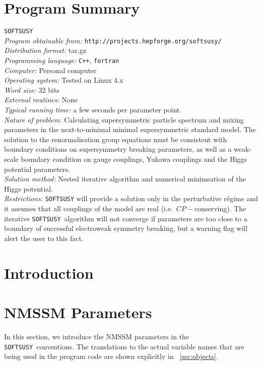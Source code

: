 \documentclass[final,3p,times,pdflatex]{elsarticle}
\def\SOFTSUSY{{\tt SOFTSUSY}}
\begin{document}
\section{Program Summary}
 \SOFTSUSY{}\\
{\em Program obtainable
  from:} {\tt http://projects.hepforge.org/softsusy/}\\
{\em Distribution format:}\/ tar.gz\\
{\em Programming language:} {\tt C++}, {\tt fortran}\\
{\em Computer:}\/ Personal computer\\
{\em Operating system:}\/ Tested on Linux 4.x\\
{\em Word size:}\/ 32 bits\\
{\em External routines:}\/ None\\
{\em Typical running time:}\/ a few seconds per parameter point.\\
{\em Nature of problem:}\/ Calculating supersymmetric particle spectrum and
mixing parameters in the next-to-minimal minimal supersymmetric standard
model. The solution to the renormalisation group equations must be consistent
with boundary conditions on supersymmetry breaking parameters, as
well as a weak-scale boundary condition on gauge 
couplings, Yukawa couplings and the Higgs potential parameters.\\
{\em Solution method:}\/ Nested iterative algorithm and numerical minimsation
of the Higgs potential. \\
{\em Restrictions:} {\SOFTSUSY} will provide a solution only in the
perturbative r\'{e}gime and it
assumes that all couplings of the model are real
(i.e.\ $CP-$conserving). The iterative \SOFTSUSY~algorithm will not 
converge if parameters are too close to a boundary of successful electroweak
symmetry breaking, but a warning flag will alert the user to this fact.

\newpage

\section{Introduction}

\section{NMSSM Parameters \label{sec:notation}}

In this section, we introduce the NMSSM parameters
in the \SOFTSUSY~conventions. The translations to the actual variable
names that are being used in the program code are shown explicitly in
~\ref{sec:objects}. 
\end{document}
